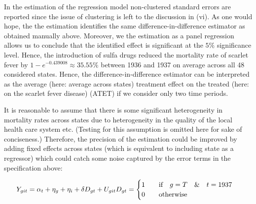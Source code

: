 \documentclass[
]{article}
\newenvironment{Shaded}{\begin{snugshade}}{\end{snugshade}}
\newcommand{\AttributeTok}[1]{\textcolor[rgb]{0.77,0.63,0.00}{#1}}
\newcommand{\DecValTok}[1]{\textcolor[rgb]{0.00,0.00,0.81}{#1}}
\newcommand{\FunctionTok}[1]{\textcolor[rgb]{0.00,0.00,0.00}{#1}}
\newcommand{\NormalTok}[1]{#1}
\newcommand{\OtherTok}[1]{\textcolor[rgb]{0.56,0.35,0.01}{#1}}
\newcommand{\SpecialCharTok}[1]{\textcolor[rgb]{0.00,0.00,0.00}{#1}}
\newcommand{\StringTok}[1]{\textcolor[rgb]{0.31,0.60,0.02}{#1}}
\begin{document}
In the estimation of the regression model non-clustered standard errors
are reported since the issue of clustering is left to the discussion in
(vi). As one would hope, the the estimation identifies the same
difference-in-difference estimator as obtained manually above. Moreover,
we the estimation as a panel regression allows us to conclude that the
identified effect is significant at the \(5\%\) significance level.
Hence, the introduction of sulfa drugs reduced the mortality rate of
scarlet fever by \(1-e^{-0.439008}\approx35.55\%\) between 1936 and 1937
on average across all 48 considered states. Hence, the
difference-in-difference estimator can be interpreted as the average
(here: average across states) treatment effect on the treated (here: on
the scarlet fever disease) (ATET) if we consider only two time periods.

It is reasonable to assume that there is some significant heterogeneity
in mortality rates across states due to heterogeneity in the quality of
the local health care system etc. (Testing for this assumption is
omitted here for sake of conciseness.) Therefore, the precision of the
estimation could be improved by adding fixed effects across states
(which is equivalent to including state as a regressor) which could
catch some noise captured by the error terms in the specification above:

\[
Y_{git}=\alpha_t+\eta_g+\eta_i+\delta D_{gt}+U_{git}\\
D_{gt}=\begin{cases} 1 \qquad \text{if} \quad g=T \quad \& \quad t=1937 \\0 \qquad \text{otherwise} \end{cases}
\]

\begin{Shaded}
\end{Shaded}
\end{document}
